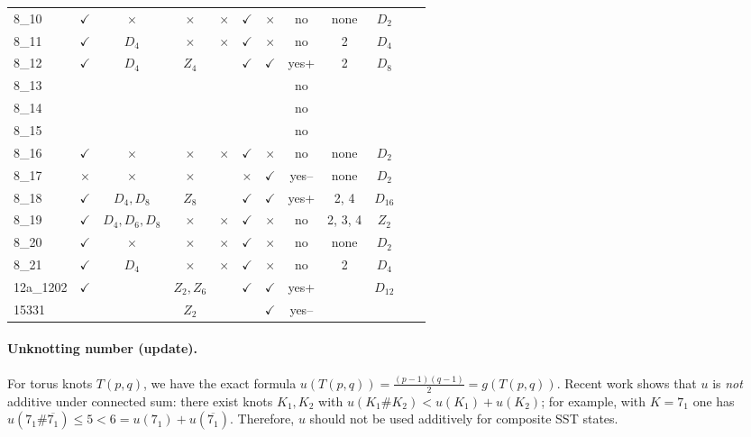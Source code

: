 \documentclass[a4paper,11pt]{article}
\begin{document}
\begin{longtable}{lccccccccccc}
8\_10 & $\checkmark$ & $\times$ & $\times$ & $\times$ & $\checkmark$ & $\times$ & no & none & $D_2$ &  &  \\
8\_11 & $\checkmark$ & $D_4$ & $\times$ & $\times$ & $\checkmark$ & $\times$ & no & 2 & $D_4$ &  &  \\
8\_12 & $\checkmark$ & $D_4$ & $Z_4$ &  & $\checkmark$ & $\checkmark$ & yes+ & 2 & $D_8$ &  &  \\
8\_13 &  &  &  &  &  &  & no &  &  &  &  \\
8\_14 &  &  &  &  &  &  & no &  &  &  &  \\
8\_15 &  &  &  &  &  &  & no &  &  &  &  \\
8\_16 & $\checkmark$ & $\times$ & $\times$ & $\times$ & $\checkmark$ & $\times$ & no & none & $D_2$ &  &  \\
8\_17 & $\times$ & $\times$ & $\times$ &  & $\times$ & $\checkmark$ & yes-- & none & $D_2$ &  &  \\
8\_18 & $\checkmark$ & $D_4, D_8$ & $Z_8$ &  & $\checkmark$ & $\checkmark$ & yes+ & 2, 4 & $D_{16}$ &  &  \\
8\_19 & $\checkmark$ & $D_4, D_6, D_8$ & $\times$ & $\times$ & $\checkmark$ & $\times$ & no & 2, 3, 4 & $Z_2$ &  &  \\
8\_20 & $\checkmark$ & $\times$ & $\times$ & $\times$ & $\checkmark$ & $\times$ & no & none & $D_2$ &  &  \\
8\_21 & $\checkmark$ & $D_4$ & $\times$ & $\times$ & $\checkmark$ & $\times$ & no & 2 & $D_4$ &  &  \\
12a\_1202 & $\checkmark$ &  & $Z_2, Z_6$ &  & $\checkmark$ & $\checkmark$ & yes+ &  & $D_{12}$ &  &  \\
15331 &  &  & $Z_2$ &  &  & $\checkmark$ & yes-- &  &  &  &  \\
\bottomrule
\end{longtable}

\paragraph{Unknotting number (update).}
For torus knots $T(p,q)$, we have the exact formula $u\!\left(T(p,q)\right)=\frac{(p-1)(q-1)}{2}=g(T(p,q))$.
Recent work shows that $u$ is \emph{not} additive under connected sum: there exist knots $K_1,K_2$ with
$u(K_1\#K_2) < u(K_1) + u(K_2)$; for example, with $K=7_1$ one has $u(7_1\#\overline{7_1}) \le 5 < 6 = u(7_1) + u(\overline{7_1})$.
Therefore, $u$ should not be used additively for composite SST states.
\end{document}
